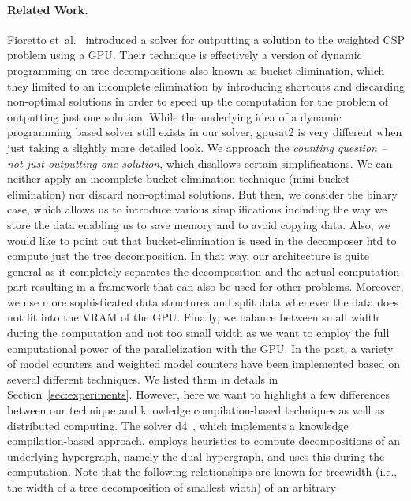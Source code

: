 \documentclass{llncs}
\makeatletter
\newcommand{\gpusatnu}{{\small\textsf{gpusat2}}\xspace}
\newcommand{\etal}{et~al.\@\xspace}
\makeatother
\begin{document}
\paragraph{Related Work.} 
Fioretto \etal~\cite{FiorettoPontelliYeoh18} introduced a solver for
outputting a solution to the weighted CSP problem using a GPU. Their
technique is effectively a version of dynamic programming on tree
decompositions also known as bucket-elimination, which they limited to
an incomplete elimination by introducing shortcuts and discarding
non-optimal solutions in order to speed up the computation for the
problem of outputting just one solution. While the underlying idea of
a dynamic programming based solver still exists in our solver,
\gpusatnu is very different when just taking a slightly more detailed
look. We approach the \emph{counting question -- not just outputting
  one solution}, which disallows certain simplifications. We can
neither apply an incomplete bucket-elimination technique (mini-bucket
elimination) nor discard non-optimal solutions. But then, we consider
the binary case, which allows us to introduce various simplifications
including the way we store the data enabling us to save memory and to
avoid copying data.
  Also, we would like to point out that bucket-elimination is used in
  the decomposer htd to compute just the tree decomposition. In that
  way, our architecture is quite general as it completely separates the
  decomposition and the actual computation part resulting in a 
  framework that can also be used for other problems.
  Moreover, we use more sophisticated data structures and split data
  whenever the data does not fit into the VRAM of the GPU.
  Finally, we balance between small width during the computation and
  not too small width as we want to employ the full computational power
  of the parallelization with the GPU.
%
In the past, a variety of model counters and weighted model counters
have been implemented based on several different techniques. We listed
them in details in Section~\ref{sec:experiments}. However, here we
want to highlight a few differences between our technique and
knowledge compilation-based techniques as well as distributed
computing. The solver d4~\cite{LagniezMarquis17a}, which implements a
knowledge compilation-based approach, employs heuristics to compute
decompositions of an underlying hypergraph, namely the dual
hypergraph, and uses this during the computation. Note that the
following relationships are known for treewidth (i.e., the width of a
tree decomposition of smallest width) of an arbitrary 
\end{document}
